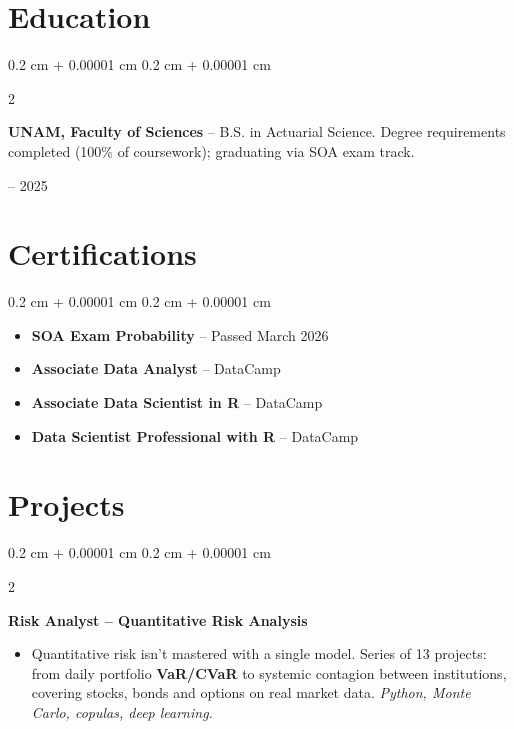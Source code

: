 \documentclass[10pt, letterpaper]{article}
\newenvironment{highlights}{
    \begin{itemize}[
        topsep=0.05 cm,
        parsep=0.05 cm,
        partopsep=0pt,
        itemsep=0pt,
        leftmargin=0.4 cm + 10pt
    ]
}{
    \end{itemize}
}
\newenvironment{highlightsforbulletentries}{
    \begin{itemize}[
        topsep=0.02 cm,
        parsep=0.05 cm,
        partopsep=0pt,
        itemsep=0pt,
        leftmargin=10pt
    ]
}{
    \end{itemize}
}
\newenvironment{onecolentry}{
    \begin{adjustwidth}{
        0.2 cm + 0.00001 cm
    }{
        0.2 cm + 0.00001 cm
    }
}{
    \end{adjustwidth}
}
\newenvironment{twocolentry}[2][]{
    \onecolentry
    \def\secondColumn{#2}
    \setcolumnwidth{\fill, 4.0 cm}
    \begin{paracol}{2}
}{
    \switchcolumn \raggedleft \secondColumn
    \end{paracol}
    \endonecolentry
}
\newenvironment{twocolentrynarrow}[2][]{
    \onecolentry
    \def\secondColumn{#2}
    \setcolumnwidth{\fill, 2.2 cm}
    \begin{paracol}{2}
}{
    \switchcolumn \raggedleft \secondColumn
    \end{paracol}
    \endonecolentry
}
\newcommand{\hl}[1]{\textcolor{primaryColor}{\textbf{#1}}}
\let\hrefWithoutArrow\href
\renewcommand{\href}[2]{\hrefWithoutArrow{#1}{\ifthenelse{\equal{#2}{}}{ }{#2 }\raisebox{.15ex}{\footnotesize \faExternalLink*}}}
\begin{document}
    \section{Education}

        \begin{twocolentry}{2021 -- 2025}
            \textbf{UNAM, Faculty of Sciences} -- B.S. in Actuarial Science. Degree requirements completed (100\% of coursework); graduating via SOA exam track.
        \end{twocolentry}

    \section{Certifications}

    \begin{onecolentry}
        \begin{highlightsforbulletentries}
            \item \textbf{SOA Exam Probability} -- Passed March 2026 \href{https://drive.google.com/file/d/1rt3emgBnPpQi7NiXkBQeA5WwJTV0JuAf/view?usp=sharing}{}
            \item \textbf{Associate Data Analyst} -- DataCamp \href{https://drive.google.com/drive/folders/1-QUuVH3zPBPsl6RhUvuUWxpZkP1i8TYb?usp=sharing}{}
            \item \textbf{Associate Data Scientist in R} -- DataCamp \href{https://drive.google.com/file/d/1xVLk15A1LBbyXH1fZnd4eBTaJ4d8FLLO/view?usp=drive_link}{}
            \item \textbf{Data Scientist Professional with R} -- DataCamp \href{https://drive.google.com/file/d/1Woe6xqxofloFZ9uM2f5VsdGxY-WQWCRI/view?usp=drive_link}{}
        \end{highlightsforbulletentries}
    \end{onecolentry}


    \section{Projects}

\begin{twocolentrynarrow}{\href{https://gonorandres.github.io/blog/risk-analyst}{blog}}
    \textbf{Risk Analyst -- Quantitative Risk Analysis}
    \begin{highlights}
        \item Quantitative risk isn't mastered with a single model. Series of 13 projects: from daily portfolio \hl{VaR/CVaR} to systemic contagion between institutions, covering stocks, bonds and options on real market data. \textit{Python, Monte Carlo, copulas, deep learning.}
    \end{highlights}
\end{twocolentrynarrow}
\end{document}
